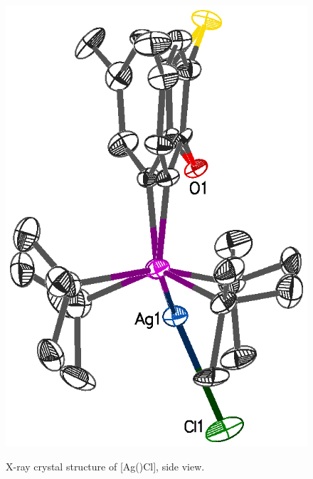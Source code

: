 \begin{figure}[htbp]
\begin{center}
\vspace{0.5cm}
\includegraphics[scale=0.8]{../Figures/Crystalthixantphossilverchloridesideview.eps}
\caption[X-ray crystal structure of [Ag(\tButhixantphos)Cl{]}, side view]{X-ray crystal structure of [Ag(\tButhixantphos)Cl], side view.}
\vspace{0.2cm}
\label{Crystalthixantphossilverchloride:sideview}
\end{center}
\end{figure}
\vspace{0.2cm}

